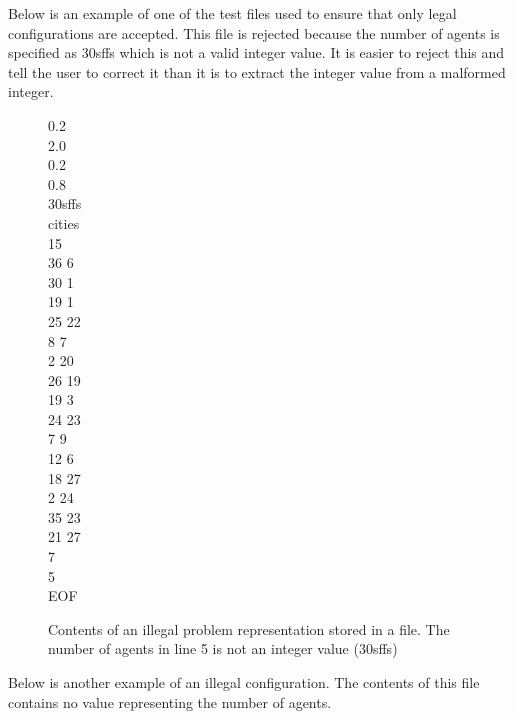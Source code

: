 Below is an example of one of the test files used to ensure that only legal configurations are accepted. This file is rejected because the number of agents is specified as 30sffs which is not a valid integer value. It is easier to reject this and tell the user to correct it than it is to extract the integer value from a malformed integer.

\begin{figure}[H]
0.2 \\
2.0 \\
0.2 \\
0.8 \\
30sffs \\
cities \\
15 \\
36 6 \\
30 1 \\
19 1 \\
25 22 \\
8 7 \\
2 20 \\
26 19 \\
19 3 \\
24 23 \\
7 9 \\
12 6 \\
18 27 \\
2 24 \\
35 23 \\
21 27 \\
7 \\
5 \\
EOF
\caption[Illegal File contents - Number Format execption]{Contents of an illegal problem representation stored in a file. The number of agents in line 5 is not an integer value (30sffs)}
\label{invalidConfigagentsNFE}
\end{figure}

Below is another example of an illegal configuration. The contents of this file contains no value representing the number of agents.

